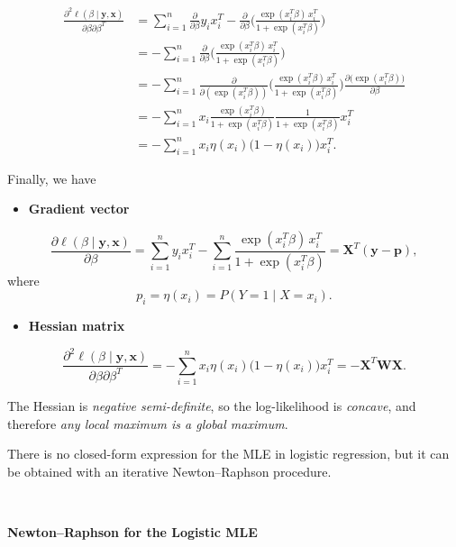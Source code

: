 \documentclass[
]{book}
\providecommand{\tightlist}{%
  \setlength{\itemsep}{0pt}\setlength{\parskip}{0pt}}
\begin{document}
\begin{align*}
\frac{\partial^2 \ell(\beta \mid \mathbf{y}, \mathbf{x})}{\partial \beta \partial \beta^T} &= \sum_{i=1}^{n} \frac{\partial }{\partial \beta}   y_i x_i^T  -  \frac{\partial }{\partial \beta}  \Biggl(\frac{\exp(x_i^T \beta)  \, x_i^T}{1+ \exp(x_i^T \beta)} \Biggr)  \\
&= - \sum_{i=1}^{n} \frac{\partial }{\partial \beta}  \Biggl(\frac{\exp(x_i^T \beta)  \, x_i^T}{1+ \exp(x_i^T \beta)} \Biggr)  \\
&= - \sum_{i=1}^{n} \frac{\partial }{\partial (\exp(x_i^T \beta)) } \Biggl(\frac{\exp(x_i^T \beta)  \, x_i^T}{1+ \exp(x_i^T \beta)} \Biggr) \frac{\partial \bigl(\exp(x_i^T \beta)\bigr) }{\partial \beta}   \\
&= - \sum_{i=1}^{n} x_i   \frac{\exp (x_i^T \beta)}{1 + \exp (x_i^T \beta)}  \frac{1}{1 + \exp (x_i^T \beta)} x_i^T\\
&= - \sum_{i=1}^{n} x_i  \eta(x_i) \bigl( 1- \eta(x_i) \bigr) x_i^T.
\end{align*}

Finally, we have

\begin{itemize}
\tightlist
\item
  \textbf{Gradient vector}
\end{itemize}

\[\frac{\partial \ell(\beta \mid \mathbf{y}, \mathbf{x})}{\partial \beta} =  \sum_{i=1}^{n} y_i x_i^T  - \sum_{i=1}^{n} \frac{\exp(x_i^T \beta)  \, x_i^T}{1+ \exp(x_i^T \beta) } = \mathbf{X}^T (\mathbf{y} - \mathbf{p}),\]
where
\[p_i = \eta(x_i) = P(Y=1 \mid X=x_i).\]

\begin{itemize}
\tightlist
\item
  \textbf{Hessian matrix}
\end{itemize}

\[\frac{\partial^2 \ell(\beta \mid \mathbf{y}, \mathbf{x})}{\partial \beta \partial \beta^T} = - \sum_{i=1}^{n} x_i  \eta(x_i) \bigl( 1- \eta(x_i) \bigr)x_i^T  = - \mathbf{X}^T \mathbf{W} \mathbf{X}.\]

The Hessian is \emph{negative semi-definite}, so the log-likelihood is \emph{concave}, and therefore \emph{any local maximum is a global maximum}.

There is no closed-form expression for the MLE in logistic regression, but it can be obtained with an iterative Newton--Raphson procedure.

~~

\textbf{Newton--Raphson for the Logistic MLE}
\end{document}
